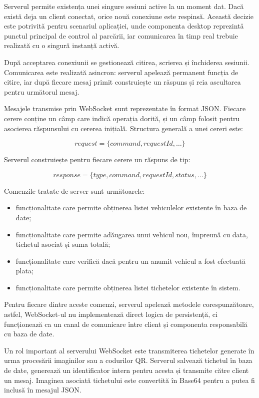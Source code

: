 Serverul permite existența unei singure sesiuni active la un moment dat. Dacă există deja un client conectat, orice nouă conexiune este respinsă. Această decizie este potrivită pentru scenariul aplicației, unde componenta desktop reprezintă punctul principal de control al parcării, iar comunicarea în timp real trebuie realizată cu o singură instanță activă.

După acceptarea conexiunii se gestionează citirea, scrierea și închiderea sesiunii. Comunicarea este realizată asincron: serverul apelează permanent funcția de citire, iar după fiecare mesaj primit construiește un răspuns și reia ascultarea pentru următorul mesaj.

Mesajele transmise prin WebSocket sunt reprezentate în format JSON. Fiecare cerere conține un câmp care indică operația dorită, și un câmp folosit pentru asocierea răspunsului cu cererea inițială. Structura generală a unei cereri este:

\[
    request = \{command, requestId, \ldots\}
\]

Serverul construiește pentru fiecare cerere un răspuns de tip:

\[
    response = \{type, command, requestId, status, \ldots\}
\]

Comenzile tratate de server sunt următoarele:

\begin{itemize}
    \item funcționalitate care permite obținerea listei vehiculelor existente în baza de date;
    \item funcționalitate care permite adăugarea unui vehicul nou, împreună cu data, tichetul asociat și suma totală;
    \item funcționalitate care verifică dacă pentru un anumit vehicul a fost efectuată plata;
    \item funcționalitate care permite obținerea listei tichetelor existente în sistem.
\end{itemize}

Pentru fiecare dintre aceste comenzi, serverul apelează metodele corespunzătoare, astfel, WebSocket-ul nu implementează direct logica de persistență, ci funcționează ca un canal de comunicare între client și componenta responsabilă cu baza de date.

Un rol important al serverului WebSocket este transmiterea tichetelor generate în urma procesării imaginilor sau a codurilor QR. Serverul salvează tichetul în baza de date, generează un identificator intern pentru acesta și transmite către client un mesaj. Imaginea asociată tichetului este convertită în Base64 pentru a putea fi inclusă în mesajul JSON.

